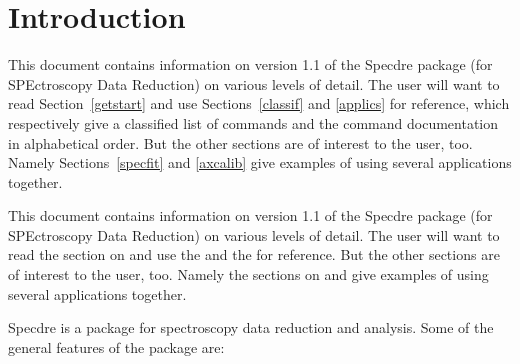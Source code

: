  \newpage
 \begin{latexonly}
   \setlength{\parskip}{0mm}
   \latexonlytoc
   \setlength{\parskip}{\medskipamount}
   \markright{\stardocname}
 \end{latexonly}
\newpage
\renewcommand{\thepage}{\arabic{page}}
\setcounter{page}{1}


\section{\label{intro}Introduction}

\begin{latexonly}
   This document contains information on version 1.1 of the Specdre
   package (for SPEctroscopy Data Reduction) on various levels of
   detail. The user will want to read
Section~\ref{getstart}
   and use
Sections~\ref{classif}
   and
\ref{applics}
   for reference, which respectively give a classified list of commands
   and the command documentation in alphabetical order. But the other
   sections are of interest to the user, too. Namely
Sections~\ref{specfit}
   and
\ref{axcalib}
   give examples of using several applications together.
\end{latexonly}
\begin{htmlonly}
   This document contains information on version 1.1 of the Specdre
   package (for SPEctroscopy Data Reduction) on various levels of
   detail. The user will want to read the section on
   and use the
   and the
   for reference. But the other sections are of interest to the user,
   too. Namely the sections on
   and
   give examples of using several applications together.
\end{htmlonly}

   Specdre is a package for spectroscopy data reduction and analysis.
   Some of the general features of the package are:

